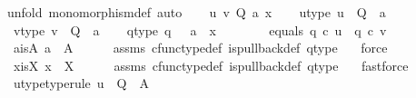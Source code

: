 \begin{isabellebody}
{\isacharparenleft}{\kern0pt}unfold\ monomorphism{\isacharunderscore}{\kern0pt}def{}{\isacharcomma}{\kern0pt}\ auto{\isacharparenright}{\kern0pt}\isanewline
\ \ \isamarkupfalse%
\ u\ v\ Q\ a\ x\isanewline
\ \ \isamarkupfalse%
\ u{\isacharunderscore}{\kern0pt}type{\isacharcolon}{\kern0pt}\ {\isachardoublequoteopen}u\ {\isacharcolon}{\kern0pt}\ Q\ {\isasymrightarrow}\ a{\isachardoublequoteclose}\ \ \isanewline
\ \ \isamarkupfalse%
\ v{\isacharunderscore}{\kern0pt}type{\isacharcolon}{\kern0pt}\ {\isachardoublequoteopen}v\ {\isacharcolon}{\kern0pt}\ Q\ {\isasymrightarrow}\ a{\isachardoublequoteclose}\isanewline
\ \ \isamarkupfalse%
\ q{}{\isacharunderscore}{\kern0pt}type{\isacharcolon}{\kern0pt}\ {\isachardoublequoteopen}q{}\ {\isacharcolon}{\kern0pt}\ \ a\ {\isasymrightarrow}\ x{\isachardoublequoteclose}\ \ \ \ \isanewline
\ \ \isamarkupfalse%
\ equals{\isacharcolon}{\kern0pt}\ {\isachardoublequoteopen}q{}\ {\isasymcirc}\isactrlsub c\ u\ {\isacharequal}{\kern0pt}\ q{}\ {\isasymcirc}\isactrlsub c\ v{\isachardoublequoteclose}\ \isanewline
\isanewline
\ \ \isamarkupfalse%
\ a{\isacharunderscore}{\kern0pt}is{\isacharunderscore}{\kern0pt}A{\isacharcolon}{\kern0pt}\ {\isachardoublequoteopen}a\ {\isacharequal}{\kern0pt}\ A{\isachardoublequoteclose}\isanewline
\ \ \ \ \isamarkupfalse%
\ assms{\isacharparenleft}{\kern0pt}{}{\isacharparenright}{\kern0pt}\ cfunc{\isacharunderscore}{\kern0pt}type{\isacharunderscore}{\kern0pt}def\ is{\isacharunderscore}{\kern0pt}pullback{\isacharunderscore}{\kern0pt}def\ q{}{\isacharunderscore}{\kern0pt}type\ \ \isamarkupfalse%
\ force\isanewline
\ \ \isamarkupfalse%
\ x{\isacharunderscore}{\kern0pt}is{\isacharunderscore}{\kern0pt}X{\isacharcolon}{\kern0pt}\ {\isachardoublequoteopen}x\ {\isacharequal}{\kern0pt}\ X{\isachardoublequoteclose}\isanewline
\ \ \ \ \isamarkupfalse%
\ assms{\isacharparenleft}{\kern0pt}{}{\isacharparenright}{\kern0pt}\ cfunc{\isacharunderscore}{\kern0pt}type{\isacharunderscore}{\kern0pt}def\ is{\isacharunderscore}{\kern0pt}pullback{\isacharunderscore}{\kern0pt}def\ q{}{\isacharunderscore}{\kern0pt}type\ \ \isamarkupfalse%
\ fastforce\isanewline
\ \ \isamarkupfalse%
\ u{\isacharunderscore}{\kern0pt}type{}{\isacharbrackleft}{\kern0pt}type{\isacharunderscore}{\kern0pt}rule{\isacharbrackright}{\kern0pt}{\isacharcolon}{\kern0pt}\ {\isachardoublequoteopen}u\ {\isacharcolon}{\kern0pt}\ Q\ {\isasymrightarrow}\ A{\isachardoublequoteclose}\isanewline

\end{isabellebody}
